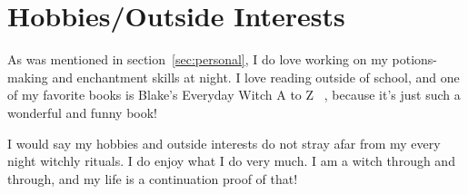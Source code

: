 \documentclass{article}
\begin{document}
\section{Hobbies/Outside Interests}
As was mentioned in section~\ref{sec:personal}, I do love working on my potions-making and enchantment skills at night. I love reading outside of school, and one of my favorite books is Blake's Everyday Witch A to Z ~\cite{blake}, because it's just such a wonderful and funny book!

I would say my hobbies and outside interests do not stray afar from my every night witchly rituals. I do enjoy what I do very much. I am a witch through and through, and my life is a continuation proof of that!


%

\end{document}
